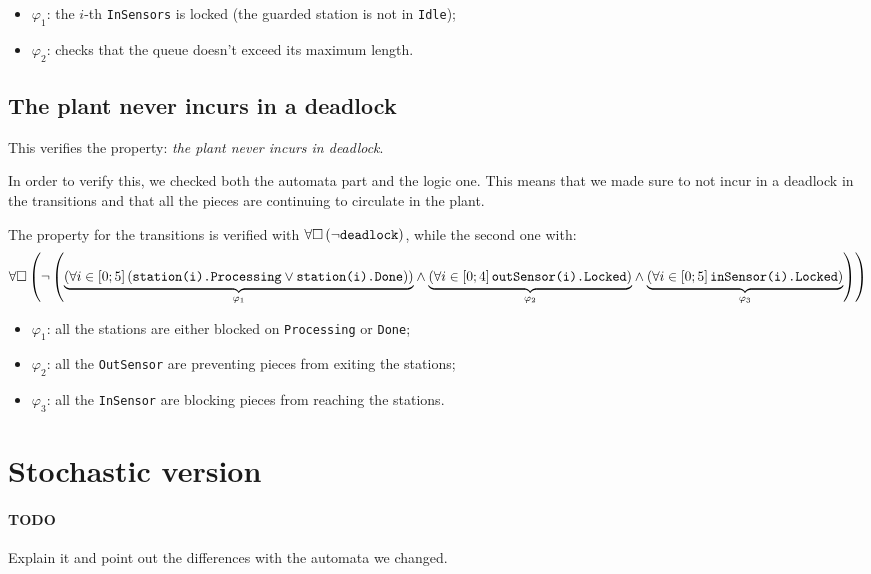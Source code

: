 \documentclass[a4paper]{article}
\newcommand{\formulacomment}[2]{\underset{\varphi_{#1}}{\underbrace{#2}}}
\newcommand{\formulatext}[1]{\text{\texttt{#1}}}
\begin{document}
    \begin{itemize}
        \item \(\varphi_1\): the \(i\)-th \texttt{InSensors} is locked (the guarded station is not in \texttt{Idle});
        \item \(\varphi_2\): checks that the queue doesn't exceed its maximum length.
    \end{itemize}

    \subsection{The plant never incurs in a deadlock} \label{property:4}

    This verifies the property: \textit{the plant never incurs in deadlock}.\medskip

    In order to verify this, we checked both the automata part and the logic one. This means that we made sure to not incur in a deadlock in the transitions and that all the pieces are continuing to circulate in the plant.\medskip

    The property for the transitions is verified with \(\forall \square \left(\neg \formulatext{deadlock}\right)\), while the second one with:
    {
        \scriptsize
        \[\forall \square \left(\neg \left(\formulacomment{1}{\left(\forall i \in \left[0; 5\right] \left(\formulatext{station(i).Processing} \vee \formulatext{station(i).Done}\right)\right)} \wedge \formulacomment{2}{\left(\forall i \in \left[0; 4\right] \formulatext{outSensor(i).Locked}\right)} \wedge \formulacomment{3}{\left(\forall i \in \left[0; 5\right] \formulatext{inSensor(i).Locked}\right)}\right)\right)\]
    }

    \begin{itemize}
        \item \(\varphi_1\): all the stations are either blocked on \texttt{Processing} or \texttt{Done};
        \item \(\varphi_2\): all the \texttt{OutSensor} are preventing pieces from exiting the stations;
        \item \(\varphi_3\): all the \texttt{InSensor} are blocking pieces from reaching the stations.
    \end{itemize}

    \section{Stochastic version}

    \paragraph{TODO} Explain it and point out the differences with the automata we changed.
\end{document}

